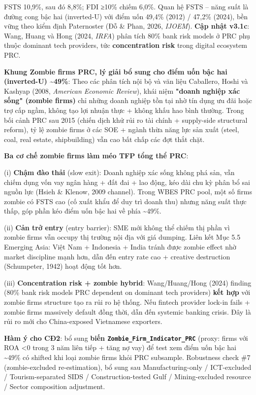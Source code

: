 \documentclass[12pt,a4paper]{article}
\begin{document}
FSTS 10,9\%, sau đó 8,8\%; FDI ≥10\% chiếm 6,0\%. Quan hệ FSTS -- năng
suất là đường cong bậc hai (inverted-U) với điểm uốn 49,4\% (2012) /
47,2\% (2024), bền vững theo kiểm định Paternoster (Đỗ \& Phan, 2026,
\emph{IJOEM}). \textbf{Cập nhật v3.1c}: Wang, Huang và Hong (2024,
\emph{IRFA}) phân tích 80\% bank risk models ở PRC phụ thuộc dominant
tech providers, tức \textbf{concentration risk} trong digital ecosystem
PRC.

\textbf{Khung Zombie firms PRC, lý giải bổ sung cho điểm uốn bậc hai
(inverted-U) \textasciitilde49\%}: Theo các phân tích nội bộ và văn liệu
Caballero, Hoshi và Kashyap (2008, \emph{American Economic Review}),
khái niệm \textbf{"doanh nghiệp xác sống" (zombie firms)} chỉ những
doanh nghiệp tồn tại nhờ tín dụng ưu đãi hoặc trợ cấp ngầm, không tạo
lợi nhuận thực + không khấu hao bình thường. Trong bối cảnh PRC sau 2015
(chiến dịch khử rủi ro tài chính + supply-side structural reform), tỷ lệ
zombie firms ở các SOE + ngành thừa năng lực sản xuất (steel, coal, real
estate, shipbuilding) vẫn cao bất chấp các đợt thắt chặt.

\textbf{Ba cơ chế zombie firms làm méo TFP tổng thể PRC}:

(i) \textbf{Chậm đào thải} (slow exit): Doanh nghiệp xác sống không phá
sản, vẫn chiếm dụng vốn vay ngân hàng + đất đai + lao động, kéo dài chu
kỳ phân bổ sai nguồn lực (Hsieh \& Klenow, 2009 channel). Trong WBES PRC
pool, một số firms zombie có FSTS cao (cố xuất khẩu để duy trì doanh
thu) nhưng năng suất thực thấp, góp phần kéo điểm uốn bậc hai về phía
\textasciitilde49\%.

(ii) \textbf{Cản trở entry} (entry barrier): SME mới không thể chiếm thị
phần vì zombie firms vẫn occupy thị trường nội địa với giá dumping. Liên
kết Mục 5.5 Emerging Asia: Việt Nam + Indonesia + India tránh được
zombie effect nhờ market discipline mạnh hơn, dẫn đến entry rate cao +
creative destruction (Schumpeter, 1942) hoạt động tốt hơn.

(iii) \textbf{Concentration risk + zombie hybrid}: Wang/Huang/Hong
(2024) finding (80\% bank risk models PRC dependent on dominant tech
providers) \textbf{kết hợp} với zombie firms structure tạo ra rủi ro hệ
thống. Nếu fintech provider lock-in fails + zombie firms massively
default đồng thời, dẫn đến systemic banking crisis. Đây là rủi ro mới
cho China-exposed Vietnamese exporters.

\textbf{Hàm ý cho CĐ2}: bổ sung \textbf{biến
\texttt{Zombie\_Firm\_Indicator\_PRC}} (proxy: firms với ROA \textless0
trong 3 năm liên tiếp + tăng nợ vay) để test xem điểm uốn bậc hai
\textasciitilde49\% có shifted khi loại zombie firms khỏi PRC subsample.
Robustness check \#7 (zombie-excluded re-estimation), bổ sung sau
Manufacturing-only / ICT-excluded / Tourism-separated SIDS /
Construction-tested Gulf / Mining-excluded resource / Sector composition
adjustment.
\end{document}
